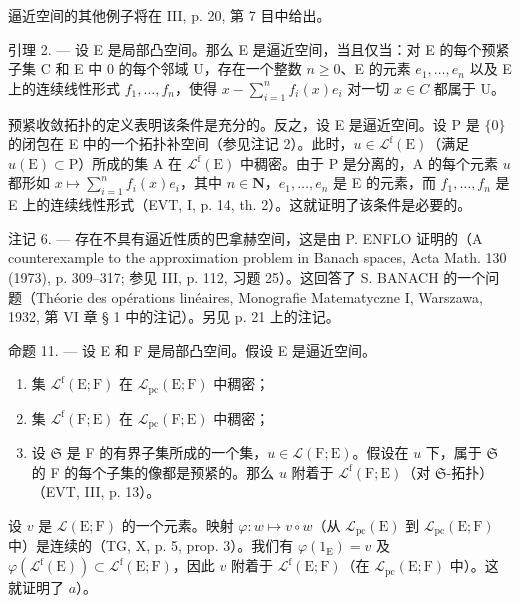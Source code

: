 逼近空间的其他例子将在 III, p. 20, 第 7 目中给出。

引理 2. --- 设 E 是局部凸空间。那么 E 是逼近空间，当且仅当：对 E 的每个预紧子集 C 和 E 中 0 的每个邻域 U，存在一个整数 \(n \geqslant 0\)、E 的元素 \(e_{1}, \ldots, e_{n}\) 以及 E 上的连续线性形式 \(f_{1}, \ldots, f_{n}\)，使得 \(x - \sum_{i=1}^{n} f_{i}(x)e_{i}\) 对一切 \(x \in C\) 都属于 U。

预紧收敛拓扑的定义表明该条件是充分的。反之，设 E 是逼近空间。设 P 是 \(\{0\}\) 的闭包在 E 中的一个拓扑补空间（参见注记 2）。此时，\(u \in \mathcal{L}^{\mathrm{f}}(\mathrm{E})\)（满足 \(u(\mathrm{E}) \subset \mathrm{P}\)）所成的集 A 在 \(\mathcal{L}^{\mathrm{f}}(\mathrm{E})\) 中稠密。由于 P 是分离的，A 的每个元素 \(u\) 都形如 \(x \mapsto \sum_{i=1}^{n} f_i(x)e_i\)，其中 \(n \in \mathbf{N}\)，\(e_1, \ldots, e_n\) 是 E 的元素，而 \(f_1, \ldots, f_n\) 是 E 上的连续线性形式（EVT, I, p. 14, th. 2）。这就证明了该条件是必要的。

注记 6. --- 存在不具有逼近性质的巴拿赫空间，这是由 P. ENFLO 证明的（A counterexample to the approximation problem in Banach spaces, Acta Math. 130 (1973), p. 309--317; 参见 III, p. 112, 习题 25）。这回答了 S. BANACH 的一个问题（Théorie des opérations linéaires, Monografie Matematyczne I, Warszawa, 1932, 第 VI 章 § 1 中的注记）。另见 p. 21 上的注记。

命题 11. --- 设 E 和 F 是局部凸空间。假设 E 是逼近空间。

\begin{enumerate}
\def\labelenumi{\alph{enumi})}
\item
  集 \(\mathcal{L}^{\mathrm{f}}(\mathrm{E};\mathrm{F})\) 在 \(\mathcal{L}_{\mathrm{pc}}(\mathrm{E};\mathrm{F})\) 中稠密；
\item
  集 \(\mathcal{L}^{\mathrm{f}}(\mathrm{F};\mathrm{E})\) 在 \(\mathcal{L}_{\mathrm{pc}}(\mathrm{F};\mathrm{E})\) 中稠密；
\item
  设 \(\mathfrak{S}\) 是 F 的有界子集所成的一个集，\(u \in \mathcal{L}(\mathrm{F};\mathrm{E})\)。假设在 \(u\) 下，属于 \(\mathfrak{S}\) 的 F 的每个子集的像都是预紧的。那么 \(u\) 附着于 \(\mathcal{L}^{\mathrm{f}}(\mathrm{F};\mathrm{E})\)（对 \(\mathfrak{S}\)-拓扑）（EVT, III, p. 13）。
\end{enumerate}

设 \(v\) 是 \(\mathcal{L}(\mathrm{E};\mathrm{F})\) 的一个元素。映射 \(\varphi\colon w\mapsto v\circ w\)（从 \(\mathcal{L}_{\mathrm{pc}}(\mathrm{E})\) 到 \(\mathcal{L}_{\mathrm{pc}}(\mathrm{E};\mathrm{F})\) 中）是连续的（TG, X, p. 5, prop. 3）。我们有 \(\varphi(1_{\mathrm{E}})=v\) 及 \(\varphi(\mathcal{L}^{\mathrm{f}}(\mathrm{E}))\subset\mathcal{L}^{\mathrm{f}}(\mathrm{E};\mathrm{F})\)，因此 \(v\) 附着于 \(\mathcal{L}^{\mathrm{f}}(\mathrm{E};\mathrm{F})\)（在 \(\mathcal{L}_{\mathrm{pc}}(\mathrm{E};\mathrm{F})\) 中）。这就证明了 \(a\)）。

